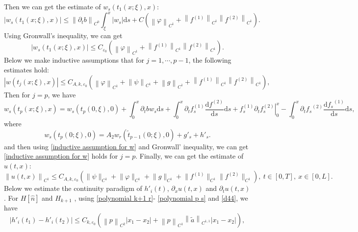 \documentclass[a4paper,reqno,11pt]{amsart}
\numberwithin{equation}{section} %
\begin{document}
Then we can get the estimate of $w_s\left( t_1(x;\xi ),x \right) $:
$$
\left| w_s\left( t_1(x;\xi ),x \right) \right|\leq \left\| \partial _tb \right\| _{C^0}\int_{\xi}^x{\left| w_s \right|\mathrm{d}s}+C\left( \left\| \varphi \right\| _{C^1}+\left\| f^{(1)} \right\| _{C^1}\left\| f^{(2)} \right\| _{C^1} \right) .
$$
Using Gronwall's inequality, we can get
$$
\left| w_s\left( t_1(x;\xi ),x \right) \right|\leq C_{\varepsilon _0}\left( \left\| \varphi \right\| _{C^1}+\left\| f^{(1)} \right\| _{C^1}\left\| f^{(2)} \right\| _{C^1} \right) .
$$
Below we make inductive assumptions that for $j=1,\cdots,p-1$, the following estimates hold:
\begin{equation}\label{inductive assumption for w}
\left| w\left( t_j(x;\xi ),x \right) \right|\leq C_{A,k,\varepsilon _0}\left( \left\| \varphi \right\| _{C^1}+\left\| \psi \right\| _{C^1}+\left\| g \right\| _{C^1}+\left\| f^{(1)} \right\| _{C^1}\left\| f^{(2)} \right\| _{C^1} \right) ,
\end{equation}
Then for $j=p$, we have
\begin{equation}\label{e of w_s p}
	w_s\left( t_p(x;\xi ),x \right) =w_s(t_p(0,\xi ),0)+\int_{0}^x{\partial _tbw_s\mathrm{d}s}+\int_{0}^x{\partial _tf_{s}^{(1)}\frac{\mathrm{d}f^{(2)}}{\mathrm{d}s}\mathrm{d}s}+\left. f_{s}^{(1)}\partial _tf_{s}^{(2)} \right|_{0}^{x}-\int_{0}^x{\partial _t{f_s}^{(2)}\frac{\mathrm{d}{f_s}^{(1)}}{\mathrm{d}s}\mathrm{d}s},
\end{equation}
where
\begin{equation}\label{w_s at t_p(t,0)}
	w_s(t_p(0 ; \xi), 0)= A_2 w_r\left(\tilde{t}_{p-1}(0 ; \xi), 0\right)+g'_s+h'_s .
\end{equation}
and then using \eqref{inductive assumption for w} and Gronwall' inequality, we can get \eqref{inductive assumption for w} holds for $j=p$.
Finally, we can get the estimate of $u(t,x)$:
\begin{equation}\label{estimate of u}
	\left\| u(t,x) \right\|_{C^1} \leq C_{A,k,\varepsilon _0}(\lVert \psi \rVert _{C^1}+\lVert \varphi  \rVert _{C^1}+  \lVert g \rVert _{C^1}+\lVert f^{(1)} \rVert _{C^1}\lVert f^{(2)} \rVert _{C^1}) ,\ t\in [0,T],\ x\in [0,L].
\end{equation}
Below we estimate the continuity paradigm of  $h'_i(t)$, $\partial _x u(t,x)$ and  $\partial _t u(t,x)$ .
For $ H\left[ \hat{n} \right] $ and $H_{k+1}$ , using \eqref{polynomial k+1 r}- \eqref{polynomial p s} and \eqref{d44}, we have
$$
\left| h' _i\left( t_1 \right) -h'_i\left( t_2 \right) \right|\leq C_{k,\varepsilon _0}(\left\| p \right\| _{C^2}\left| x_1-x_2 \right|+\left\| p \right\| _{C^1}\left\| \tilde{a} \right\| _{C^{1,1}}\left| x_1-x_2 \right|),
$$
\end{document}
